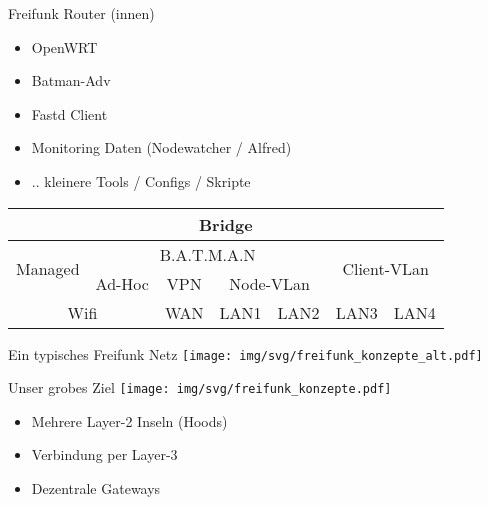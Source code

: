 \begin{frame}{Freifunk Router (innen)}
    \begin{itemize}
        \item OpenWRT
        \item Batman-Adv
        \item Fastd Client
        \item Monitoring Daten (Nodewatcher / Alfred)
        \item .. kleinere Tools / Configs / Skripte
    \end{itemize}

    \renewcommand{\arraystretch}{1.5}
    \begin{tabular}{|c|c|c|c|c|c|c|} \hline
         \multicolumn{7}{|c|}{Bridge} \\ \hline
         \multirow{2}{*}{Managed} &
         \multicolumn{4}{c|}{B.A.T.M.A.N} &
         \multicolumn{2}{c|}{\multirow{2}{*}{Client-VLan}} \\ \cline{2-5}
         & Ad-Hoc & VPN & \multicolumn{2}{c|}{Node-VLan} & \multicolumn{2}{c|}{} \\ \hline
         \multicolumn{2}{|c|}{Wifi} & WAN & LAN1 & LAN2 &
         LAN3 & LAN4 \\ \hline
    \end{tabular}
\end{frame}

\begin{frame}{Ein typisches Freifunk Netz}
    \texttt{[image: img/svg/freifunk\_konzepte\_alt.pdf]}
\end{frame}

\begin{frame}{Unser grobes Ziel}
    \texttt{[image: img/svg/freifunk\_konzepte.pdf]}

    \begin{itemize}
        \item Mehrere Layer-2 Inseln (Hoods)
        \item Verbindung per Layer-3
        \item Dezentrale Gateways
    \end{itemize}
\end{frame}

